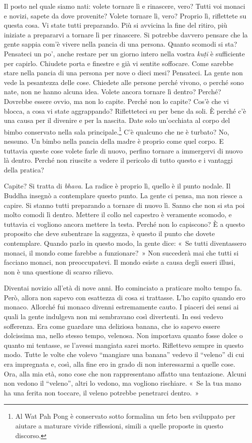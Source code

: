 Il posto nel quale siamo nati: volete tornare lì e rinascere, vero?
Tutti voi monaci e novizi, sapete da dove provenite? Volete tornare lì,
vero? Proprio lì, riflettete su questa cosa. Vi state tutti preparando.
Più si avvicina la fine del ritiro, più iniziate a prepararvi a tornare
lì per rinascere. Si potrebbe davvero pensare che la gente sappia com'è
vivere nella pancia di una persona. Quanto scomodi si sta? Pensateci un
po', anche restare per un giorno intero nella vostra \emph{kuṭī} è
sufficiente per capirlo. Chiudete porta e finestre e già vi sentite
soffocare. Come sarebbe stare nella pancia di una persona per nove o
dieci mesi? Pensateci. La gente non vede la pesantezza delle cose.
Chiedete alle persone perché vivono, o perché sono nate, non ne hanno
alcuna idea. Volete ancora tornare lì dentro? Perché? Dovrebbe essere
ovvio, ma non lo capite. Perché non lo capite? Cos'è che vi blocca, a
cosa vi state aggrappando? Rifletteteci su per bene da soli. È perché
c'è una causa per il divenire e per la nascita. Date solo un'occhiata al
corpo del bimbo conservato nella sala principale.\footnote{Al Wat Pah
  Pong è conservato sotto formalina un feto ben sviluppato per aiutare a
  maturare vivide riflessioni, simili a quelle proposte in questo
  discorso.} C'è qualcuno che ne è turbato? No, nessuno. Un bimbo nella
pancia della madre è proprio come quel corpo. E tuttavia queste cose
volete farle di nuovo, perfino tornare a immergervi di nuovo là dentro.
Perché non riuscite a vedere il pericolo di tutto questo e i vantaggi
della pratica?

Capite? Si tratta di \emph{bhava}. La radice è proprio lì, quello è il
punto nodale. Il Buddha insegnò a contemplare questo punto. La gente ci
pensa, ma non riesce a capire. Si stanno tutti preparando a tornare di
nuovo lì. Sanno che non si sta poi molto comodi lì dentro. Mettere il
collo nel capestro è veramente scomodo, e tuttavia ci vogliono ancora
mettere la testa. Perché non lo capiscono? È a questo proposito che deve
subentrare la saggezza, è questo il punto che dovete contemplare. Quando
parlo in questo modo, la gente dice: «~Se tutti diventassero monaci, il
mondo come farebbe a funzionare?~» Non succederà mai che tutti si
facciano monaci, non preoccupatevi. Il mondo esiste a causa degli esseri
illusi, non è una questione di scarso rilievo.

Diventai novizio all'età di nove anni. Ho cominciato a praticare molto
tempo fa. Però, allora non sapevo con esattezza di cosa si trattasse.
L'ho capito quando ero monaco. Allorché fui monaco divenni estremamente
cauto. I piaceri dei sensi ai quali la gente indulgeva non mi sembravano
così divertenti. In essi vedevo sofferenza. Era come guardare una
deliziosa banana, che io sapevo essere dolcissima ma, nello stesso
tempo, velenosa. Non importava quanto fosse dolce o quanto mi tentasse,
se l'avessi mangiata sarei morto. Riflettevo sempre in questo modo.
Tutte le volte che volevo ``mangiare una banana'' vedevo il ``veleno''
di cui era impregnata e, così, alla fine ero in grado di non
interessarmi a quelle cose. Ora, alla mia età, sono cose che non
rappresentano affatto una tentazione. Alcuni non vedono il ``veleno'',
altri lo vedono, ma vogliono rischiare. «~Se la tua mano ha una ferita
non toccare, il veleno potrebbe penetrarci dentro.~»

